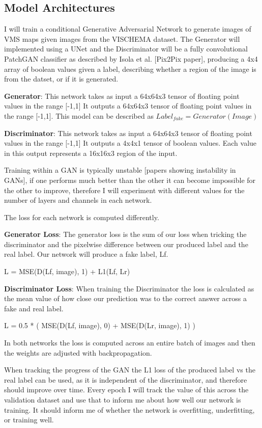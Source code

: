 \documentclass{UoYCSproject}
\begin{document}
\subsection{Model Architectures}

I will train a conditional Generative Adversarial Network to generate images of VMS maps given images from the VISCHEMA dataset. The Generator will implemented using a UNet and the Discriminator will be a fully convolutional PatchGAN classifier as described by Isola et al. [Pix2Pix paper], producing a 4x4 array of boolean values given a label, describing whether a region of the image is from the datset, or if it is generated.

\textbf{Generator}: This network takes as input a 64x64x3 tensor of floating point values in the range [-1,1]
It outputs a 64x64x3 tensor of floating point values in the range [-1,1].
This model can be described as $ Label_{fake} = Generator(Image) $

\textbf{Discriminator}: This network takes as input a 64x64x3 tensor of floating point values in the range [-1,1]
It outputs a 4x4x1 tensor of boolean values. Each value in this output represents a 16x16x3 region of the input.

Training within a GAN is typically unstable [papers showing instability in GANs], if one performs much better than the other it can become impossible for the other to improve, therefore I will experiment with different values for the number of layers and channels in each network.

The loss for each network is computed differently.

\textbf{Generator Loss}: The generator loss is the sum of our loss when tricking the discriminator and the pixelwise difference between our produced label and the real label. Our network will produce a fake label, Lf. 

L = MSE(D(Lf, image), 1) + L1(Lf, Lr) 

\textbf{Discriminator Loss}: When training the Discriminator the loss is calculated as the mean value of how close our prediction was to the correct answer across a fake and real label.

L = 0.5 * ( MSE(D(Lf, image), 0) + MSE(D(Lr, image), 1) ) 

In both networks the loss is computed across an entire batch of images and then the weights are adjusted with backpropagation.

When tracking the progress of the GAN the L1 loss of the produced label vs the real label can be used, as it is independent of the discriminator, and therefore should improve over time. Every epoch I will track the value of this across the validation dataset and use that to inform me about how well our network is training. It should inform me of whether the network is overfitting, underfitting, or training well. 
\end{document}
